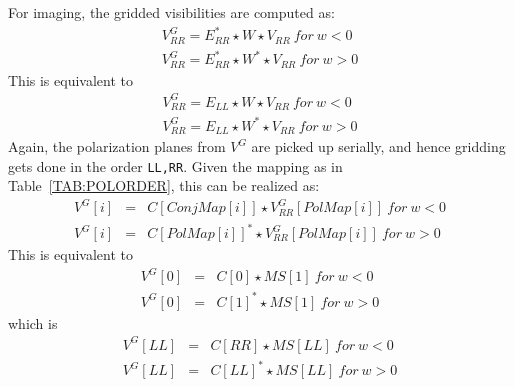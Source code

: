 \documentclass[11pt,epsf]{article}
\begin{document}
For imaging, the gridded visibilities are computed as:
\begin{eqnarray}
 V^G_{RR} = E_{RR}^* \star W \star V_{RR}~for~w<0 \nonumber \\
 V^G_{RR} = E_{RR}^* \star W^* \star V_{RR}~for~w>0
\end{eqnarray}
This is equivalent to
\begin{eqnarray}
 V^G_{RR} = E_{LL} \star W \star V_{RR}~for~w<0 \nonumber \\
 V^G_{RR} = E_{LL} \star W^* \star V_{RR}~for~w>0
\end{eqnarray}
Again, the polarization planes from $V^G$ are picked up serially, and
hence gridding gets done in the order {\tt LL,RR}.
Given the mapping as in Table~\ref{TAB:POLORDER}, this can be realized
as:
\begin{eqnarray}
 V^G[i] &=& C[ConjMap[i]] \star V^G_{RR}[PolMap[i]]~for~w<0 \nonumber \\
 V^G[i] &=& C[PolMap[i]]^* \star V^G_{RR}[PolMap[i]]~for~w>0 
\end{eqnarray}
This is equivalent to
\begin{eqnarray}
 V^G[0]&=&C[0] \star MS[1]~for~w<0\nonumber\\
 V^G[0]&=&C[1]^* \star MS[1]~for~w>0
\end{eqnarray}
which is 
\begin{eqnarray}
 V^G[LL]&=&C[RR] \star MS[LL]~for~w<0\nonumber\\
 V^G[LL]&=&C[LL]^* \star MS[LL]~for~w>0
\end{eqnarray}
\end{document}
